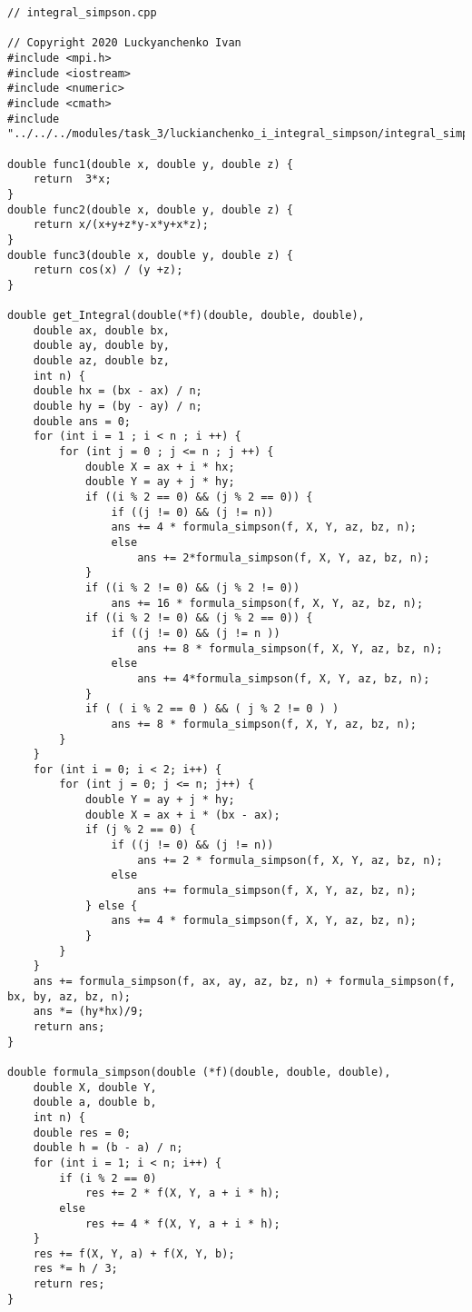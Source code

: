 \documentclass{report}
\begin{document}
\begin{lstlisting}
// integral_simpson.cpp

// Copyright 2020 Luckyanchenko Ivan
#include <mpi.h>
#include <iostream>
#include <numeric>
#include <cmath>
#include "../../../modules/task_3/luckianchenko_i_integral_simpson/integral_simpson.h"

double func1(double x, double y, double z) {
    return  3*x;
}
double func2(double x, double y, double z) {
    return x/(x+y+z*y-x*y+x*z);
}
double func3(double x, double y, double z) {
    return cos(x) / (y +z);
}

double get_Integral(double(*f)(double, double, double),
    double ax, double bx,
    double ay, double by,
    double az, double bz,
    int n) {
    double hx = (bx - ax) / n;
    double hy = (by - ay) / n;
    double ans = 0;
    for (int i = 1 ; i < n ; i ++) {
        for (int j = 0 ; j <= n ; j ++) {
            double X = ax + i * hx;
            double Y = ay + j * hy;
            if ((i % 2 == 0) && (j % 2 == 0)) {
                if ((j != 0) && (j != n))
                ans += 4 * formula_simpson(f, X, Y, az, bz, n);
                else
                    ans += 2*formula_simpson(f, X, Y, az, bz, n);
            }
            if ((i % 2 != 0) && (j % 2 != 0))
                ans += 16 * formula_simpson(f, X, Y, az, bz, n);
            if ((i % 2 != 0) && (j % 2 == 0)) {
                if ((j != 0) && (j != n ))
                    ans += 8 * formula_simpson(f, X, Y, az, bz, n);
                else
                    ans += 4*formula_simpson(f, X, Y, az, bz, n);
            }
            if ( ( i % 2 == 0 ) && ( j % 2 != 0 ) )
                ans += 8 * formula_simpson(f, X, Y, az, bz, n);
        }
    }
    for (int i = 0; i < 2; i++) {
        for (int j = 0; j <= n; j++) {
            double Y = ay + j * hy;
            double X = ax + i * (bx - ax);
            if (j % 2 == 0) {
                if ((j != 0) && (j != n))
                    ans += 2 * formula_simpson(f, X, Y, az, bz, n);
                else
                    ans += formula_simpson(f, X, Y, az, bz, n);
            } else {
                ans += 4 * formula_simpson(f, X, Y, az, bz, n);
            }
        }
    }
    ans += formula_simpson(f, ax, ay, az, bz, n) + formula_simpson(f, bx, by, az, bz, n);
    ans *= (hy*hx)/9;
    return ans;
}

double formula_simpson(double (*f)(double, double, double),
    double X, double Y,
    double a, double b,
    int n) {
    double res = 0;
    double h = (b - a) / n;
    for (int i = 1; i < n; i++) {
        if (i % 2 == 0)
            res += 2 * f(X, Y, a + i * h);
        else
            res += 4 * f(X, Y, a + i * h);
    }
    res += f(X, Y, a) + f(X, Y, b);
    res *= h / 3;
    return res;
}


\end{lstlisting}
\end{document}
